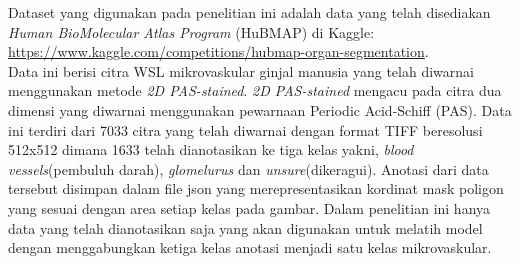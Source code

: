 \noindent Dataset yang digunakan pada penelitian ini adalah data yang telah disediakan \textit{Human BioMolecular Atlas Program }(HuBMAP) di Kaggle: \url{https://www.kaggle.com/competitions/hubmap-organ-segmentation}\cite{howard_hubmap_2023}.\\
Data ini berisi citra WSL mikrovaskular ginjal manusia yang telah diwarnai menggunakan metode \textit{2D PAS-stained}. \textit{2D PAS-stained} mengacu pada citra dua dimensi yang diwarnai menggunakan pewarnaan Periodic Acid-Schiff (PAS). Data ini terdiri dari 7033 citra yang telah diwarnai dengan format TIFF beresolusi 512x512 dimana 1633 telah dianotasikan ke tiga kelas yakni, \textit{blood vessels}(pembuluh darah), \textit{glomelurus} dan \textit{unsure}(dikeragui).  Anotasi dari data tersebut disimpan dalam file json yang merepresentasikan kordinat mask poligon yang sesuai dengan area setiap kelas pada gambar. Dalam penelitian ini hanya data yang telah dianotasikan saja yang akan digunakan untuk melatih model dengan menggabungkan ketiga kelas anotasi menjadi satu kelas mikrovaskular.

